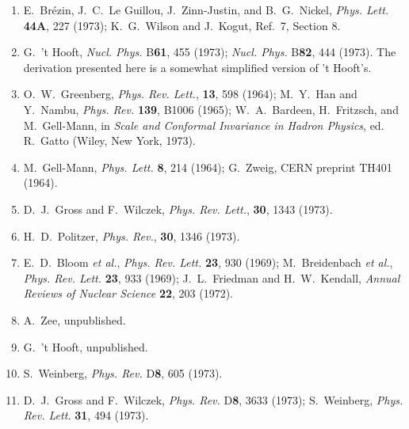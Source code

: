 \begin{enumerate}
  \item[8a.] \label{ch18-ref-8a}
  E.~Br\'ezin, J.~C.~Le Guillou, J.~Zinn-Justin, and B.~G.~Nickel, \textit{Phys. Lett.} \textbf{44A}, 227 (1973); K.~G.~Wilson and J.~Kogut, Ref.~7, Section 8.

  \item {}\label{ch18-ref-9}
  G.~'t Hooft, \textit{Nucl. Phys.} B\textbf{61}, 455 (1973); \textit{Nucl. Phys.} B\textbf{82}, 444 (1973). The derivation presented here is a somewhat simplified version of 't Hooft's.

  \item {}\label{ch18-ref-10}
  O.~W.~Greenberg, \textit{Phys. Rev. Lett.}, \textbf{13}, 598 (1964); M.~Y.~Han and Y.~Nambu, \textit{Phys. Rev.} \textbf{139}, B1006 (1965); W.~A.~Bardeen, H.~Fritzsch, and M.~Gell-Mann, in \textit{Scale and Conformal Invariance in Hadron Physics}, ed. R.~Gatto (Wiley, New York, 1973).

  \item {}\label{ch18-ref-11}
  M.~Gell-Mann, \textit{Phys. Lett.} \textbf{8}, 214 (1964); G.~Zweig, CERN preprint TH401 (1964).

  \item {}\label{ch18-ref-12}
  D.~J.~Gross and F.~Wilczek, \textit{Phys. Rev. Lett.}, \textbf{30}, 1343 (1973).

  \item {}\label{ch18-ref-13}
  H.~D.~Politzer, \textit{Phys. Rev.}, \textbf{30}, 1346 (1973).

  \item {}\label{ch18-ref-14}
  E.~D.~Bloom \textit{et al.}, \textit{Phys. Rev. Lett.} \textbf{23}, 930 (1969); M.~Breidenbach \textit{et al.}, \textit{Phys. Rev. Lett.} \textbf{23}, 933 (1969); J.~L.~Friedman and H.~W.~Kendall, \textit{Annual Reviews of Nuclear Science} \textbf{22}, 203 (1972).

  \item {}\label{ch18-ref-15}
  A.~Zee, unpublished.

  \item {}\label{ch18-ref-16}
  G.~'t Hooft, unpublished.

  \item {}\label{ch18-ref-17}
  S.~Weinberg, \textit{Phys. Rev.} D\textbf{8}, 605 (1973).

  \item {}\label{ch18-ref-18}
  D.~J.~Gross and F.~Wilczek, \textit{Phys. Rev.} D\textbf{8}, 3633 (1973); S.~Weinberg, \textit{Phys. Rev. Lett.} \textbf{31}, 494 (1973).


\end{enumerate}
